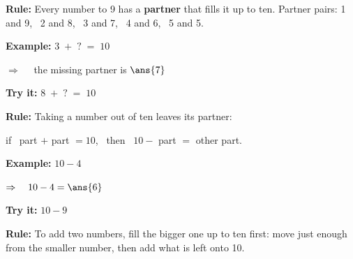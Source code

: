 \documentclass[12pt]{article}
\begin{document}


\begin{formulabox}
\textbf{Rule:} Every number to 9 has a \textbf{partner} that fills it up to
ten. Partner pairs: 1 and 9, \ 2 and 8, \ 3 and 7, \ 4 and 6, \ 5 and 5.
\end{formulabox}

\begin{examplebox}
\textbf{Example:} \quad $3\;+\;?\;=\;10$

$\Rightarrow\quad$ the missing partner is $\ans{7}$
\end{examplebox}

\begin{tryitbox}
\textbf{Try it:} \quad $8\;+\;?\;=\;10$\\[2pt]
\end{tryitbox}


\begin{formulabox}
\textbf{Rule:} Taking a number out of ten leaves its partner:\par
if \ part $+$ part $=10$, \ then \ $10 -$ part $=$ other part.
\end{formulabox}

\begin{examplebox}
\textbf{Example:} \quad $10 - 4$

$\Rightarrow\quad 10 - 4 = \ans{6}$
\end{examplebox}

\begin{tryitbox}
\textbf{Try it:} \quad $10 - 9$\\[2pt]
\end{tryitbox}


\begin{formulabox}
\textbf{Rule:} To add two numbers, fill the bigger one up to ten first: move
just enough from the smaller number, then add what is left onto 10.
\end{formulabox}
\end{document}
